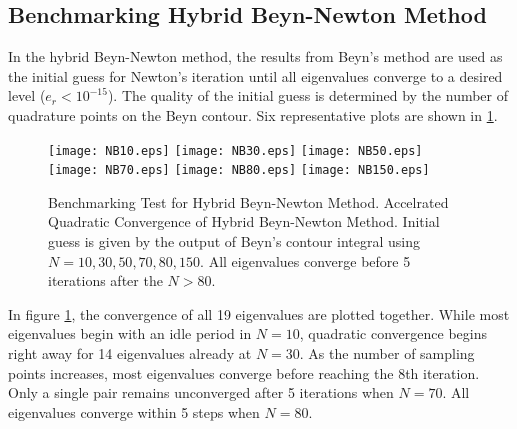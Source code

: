 \documentclass[11pt,letterpaper]{article}
\begin{document}
\subsection{Benchmarking Hybrid Beyn-Newton Method}
In the hybrid Beyn-Newton method, the results from Beyn's method are used as the initial guess for Newton's iteration until all eigenvalues converge to a desired level ($e_r<10^{-15}$). The quality of the initial guess is determined by the number of quadrature points on the Beyn contour. Six representative plots are shown in \ref{fig:BeynNewton}. 
\begin{figure}\label{fig:BeynNewton}
\begin{center}
\texttt{[image: NB10.eps]}
\texttt{[image: NB30.eps]}
\texttt{[image: NB50.eps]}
\texttt{[image: NB70.eps]}
\texttt{[image: NB80.eps]}
\texttt{[image: NB150.eps]}
\end{center}
\caption{Benchmarking Test for Hybrid Beyn-Newton Method. \textnormal{Accelrated Quadratic Convergence of Hybrid Beyn-Newton Method. Initial guess is given by the output of Beyn's contour integral using $N=10,30,50,70,80,150$. All eigenvalues converge before 5 iterations after the $N>80$.}}
\end{figure}
In figure \ref{fig:BeynNewton}, the convergence of all 19 eigenvalues are plotted together. While most eigenvalues begin with an idle period in $N=10$, quadratic convergence begins right away for 14 eigenvalues already at $N=30$.
As the number of sampling points increases, most eigenvalues converge before reaching the 8th iteration. Only a single pair remains unconverged after 5 iterations when $N=70$. All eigenvalues converge within 5 steps when $N=80$. 

\end{document}

